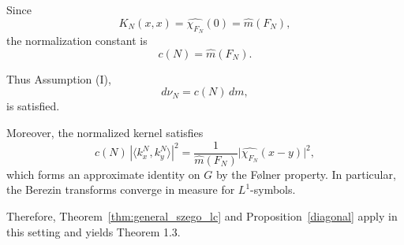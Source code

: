 \documentclass{amsart}
\newtheorem{cor}[thm]{Corollary}
\theoremstyle{definition}
\theoremstyle{remark}
\numberwithin{equation}{section}
\begin{document}
Since
\[
K_N(x,x)
=
\widehat{\chi_{F_N}}(0)
=
\widehat{m}(F_N),
\]
the normalization constant is
\[
c(N)=\widehat{m}(F_N).
\]

Thus Assumption (I),
\[
d\nu_N = c(N)\, dm,
\]
is satisfied.

Moreover, the normalized kernel satisfies
\[
c(N)\, |\langle k_x^N,k_y^N\rangle|^2
=
\frac{1}{\widehat{m}(F_N)}
\big|\widehat{\chi_{F_N}}(x-y)\big|^2,
\]
which forms an approximate identity on $G$ by the F\o lner property.
In particular, the Berezin transforms converge in measure for
$L^1$-symbols.

Therefore, Theorem~\ref{thm:general_szego_lc} and Proposition~\ref{diagonal}
apply in this setting and yields Theorem 1.3.

\medskip








\medskip

\end{document}
